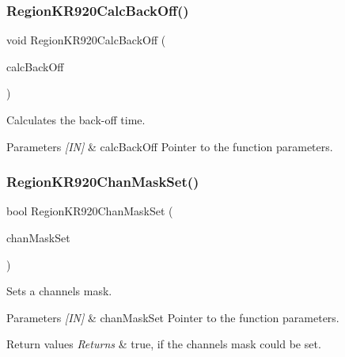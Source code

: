 \subsubsection{\texorpdfstring{Region\+K\+R920\+Calc\+Back\+Off()}{RegionKR920CalcBackOff()}}
{\footnotesize\ttfamily void Region\+K\+R920\+Calc\+Back\+Off (\begin{DoxyParamCaption}\item[{\hyperlink{group__REGION_ga7c5c9a8da174e6679eded8257dc92fd9}{Calc\+Back\+Off\+Params\+\_\+t} $\ast$}]{calc\+Back\+Off }\end{DoxyParamCaption})}



Calculates the back-\/off time. 


\begin{DoxyParams}{Parameters}
{\em \mbox{[}\+I\+N\mbox{]}} & calc\+Back\+Off Pointer to the function parameters. \\
\hline
\end{DoxyParams}
\mbox{\label{group__REGIONKR920_gaf936d129f52abf7d56602258dece3f9f}} 
\subsubsection{\texorpdfstring{Region\+K\+R920\+Chan\+Mask\+Set()}{RegionKR920ChanMaskSet()}}
{\footnotesize\ttfamily bool Region\+K\+R920\+Chan\+Mask\+Set (\begin{DoxyParamCaption}\item[{\hyperlink{group__REGION_ga6d24f7da136006410827dfb29f6b9b9e}{Chan\+Mask\+Set\+Params\+\_\+t} $\ast$}]{chan\+Mask\+Set }\end{DoxyParamCaption})}



Sets a channels mask. 


\begin{DoxyParams}{Parameters}
{\em \mbox{[}\+I\+N\mbox{]}} & chan\+Mask\+Set Pointer to the function parameters.\\
\hline
\end{DoxyParams}

\begin{DoxyRetVals}{Return values}
{\em Returns} & true, if the channels mask could be set. \\
\hline
\end{DoxyRetVals}
\mbox{\label{group__REGIONKR920_gaca1aceccde474cc473e09dc3113ec876}} 
